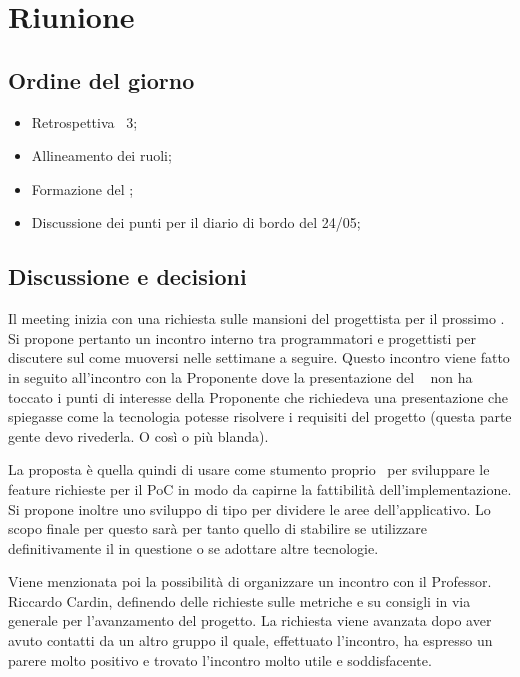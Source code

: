 \section{Riunione}
\subsection{Ordine del giorno}
\begin{itemize}
	\item Retrospettiva \ 3;
	\item Allineamento dei ruoli;
	\item Formazione del ;
	\item Discussione dei punti per il diario di bordo del 24/05;
\end{itemize}

\subsection{Discussione e decisioni}
\par Il meeting inizia con una richiesta sulle mansioni del progettista per il prossimo . 
Si propone pertanto un incontro interno tra programmatori e progettisti per discutere sul come muoversi nelle settimane a seguire. 
Questo incontro viene fatto in seguito all'incontro con la Proponente dove la presentazione del \  non ha toccato i punti di interesse della Proponente che richiedeva una presentazione che spiegasse come la tecnologia potesse risolvere i requisiti del progetto (questa parte gente devo rivederla. O così o più blanda).
\par La proposta è quella quindi di usare come stumento proprio \ per sviluppare le feature richieste per il PoC in modo da capirne la fattibilità dell'implementazione. 
Si propone inoltre uno sviluppo di tipo  per dividere le aree dell'applicativo. 
Lo scopo finale per questo  sarà per tanto quello di stabilire se utilizzare definitivamente il  in questione o se adottare altre tecnologie.
\par Viene menzionata poi la possibilità di organizzare un incontro con il Professor. Riccardo Cardin, definendo delle richieste sulle metriche e su consigli in via generale per l'avanzamento del progetto. 
La richiesta viene avanzata dopo aver avuto contatti da un altro gruppo il quale, effettuato l'incontro, ha espresso un parere molto positivo e trovato l'incontro molto utile e soddisfacente.
